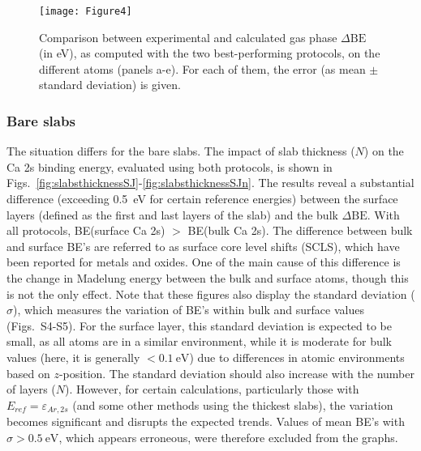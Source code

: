 \documentclass[journal=jpccck,manuscript=article]{achemso}
\def\dbe{\ensuremath{\Delta\text{BE}}}
\begin{document}
\begin{figure}[p]
	\centering
	\texttt{[image: Figure4]}
	\caption{Comparison between experimental and calculated gas phase \dbe{} (in \si{\electronvolt}), as computed with the two best-performing protocols, on the different atoms (panels a-e). For each of them, the error (as mean $\pm$ standard deviation) is given.}
	\label{fig:xps_C185}
\end{figure}

\clearpage

\subsubsection{Bare slabs}

The situation differs for the bare slabs. The impact of slab thickness ($N$) on the Ca 2s binding energy, evaluated using both protocols, is shown in Figs.~\ref{fig:slabsthicknessSJ}-\ref{fig:slabsthicknessSJn}. The results reveal a substantial difference (exceeding \SI{0.5}{\electronvolt} for certain reference energies) between the surface layers (defined as the first and last layers of the slab) and the bulk \dbe{}. With all protocols, BE(surface Ca 2s) $>$ BE(bulk Ca 2s). The difference between bulk and surface BE's are referred to as surface core level shifts (SCLS),\cite{olovssonCorelevelShiftsComplex2006,bagusChemicalSignificanceXray2023} which have been reported for metals\cite{aldenInitioSurfaceCorelevel1993,weinertCorelevelShiftsBulk1995,olovssonCorelevelShiftsComplex2006} and oxides\cite{harmerSpeciesFormedCuprite2009,lousadaFirstStagesOxide2018,bagusRevisitingSurfaceCorelevel2019,cristinadeoliveiraRoleSurfacesMagnetic2021,silvalucenademedeirosAMoO3MicroNanoparticles2024}. One of the main cause of this difference is the change in Madelung energy between the bulk and surface atoms\cite{nelinSurfaceCorelevelBinding2014}, though this is not the only effect\cite{bagusRevisitingSurfaceCorelevel2019,bagusChemicalSignificanceXray2023,bagusXrayPhotoelectronSpectroscopy2024}. 
Note that these figures also display the standard deviation ($\sigma$), which measures the variation of BE's within bulk and surface values (Figs.~S4-S5). For the surface layer, this standard deviation is expected to be small, as all atoms are in a similar environment, while it is moderate for bulk values (here, it is generally $<\SI{0.1}{\electronvolt}$) due to differences in atomic environments based on $z$-position. The standard deviation should also increase with the number of layers ($N$). However, for certain calculations, particularly those with $E_{ref}=\varepsilon_{Ar,2s}$ (and some other methods using the thickest slabs), the variation becomes significant and disrupts the expected trends. Values of mean BE's with $\sigma > \SI{0.5}{\electronvolt}$, which appears erroneous, were therefore excluded from the graphs.
\end{document}
